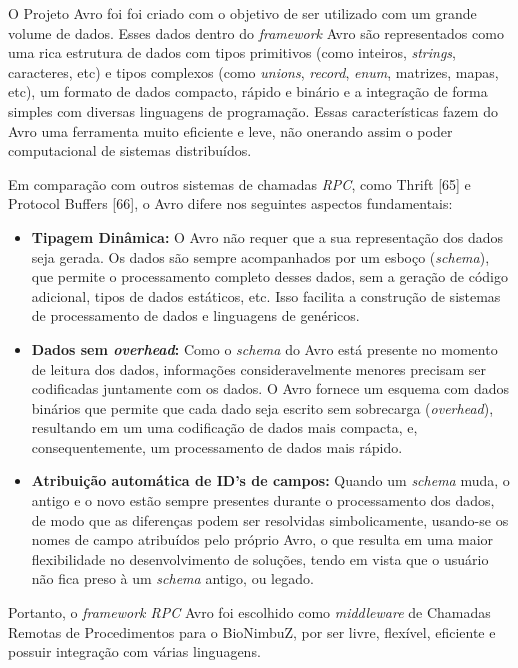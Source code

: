O Projeto Avro foi foi criado com o objetivo de ser utilizado com um grande volume de dados. Esses dados dentro do \textit{framework} Avro são representados como uma rica estrutura de dados com tipos primitivos (como inteiros, \textit{strings}, caracteres, etc) e tipos complexos (como \textit{unions}, \textit{record}, \textit{enum}, matrizes, mapas, etc), um formato de dados compacto, rápido e binário e a integração de forma simples com diversas linguagens de programação. Essas características fazem do Avro uma ferramenta muito eficiente e leve, não onerando assim o poder computacional de sistemas distribuídos.

Em comparação com outros sistemas de chamadas \textit{RPC}, como Thrift [65] e Protocol Buffers [66], o Avro difere nos seguintes aspectos fundamentais:

\begin{itemize}
	\item \textbf{Tipagem Dinâmica:} O Avro não requer que a sua representação dos dados seja gerada. Os dados são sempre acompanhados por um esboço (\textit{schema}), que permite o processamento completo desses dados, sem a geração de código adicional, tipos de dados estáticos, etc. Isso facilita a construção de sistemas de processamento de dados e linguagens de genéricos.
    
    \item \textbf{Dados sem \textit{overhead}:} Como o \textit{schema} do Avro está presente no momento de leitura dos dados, informações consideravelmente menores precisam ser codificadas juntamente com os dados. O Avro fornece um esquema com dados binários que permite que cada dado seja escrito sem sobrecarga (\textit{overhead}), resultando em um uma codificação de dados mais compacta, e, consequentemente, um processamento de dados mais rápido.
    
    \item \textbf{Atribuição automática de ID's de campos:} Quando um \textit{schema} muda, o antigo e o novo estão sempre presentes durante o processamento dos dados, de modo que as diferenças podem ser resolvidas simbolicamente, usando-se os nomes de campo atribuídos pelo próprio Avro, o que resulta em uma maior flexibilidade no desenvolvimento de soluções, tendo em vista que o usuário não fica preso à um \textit{schema} antigo, ou legado.
    
\end{itemize}

Portanto, o \textit{framework RPC} Avro foi escolhido como \textit{middleware} de Chamadas Remotas de Procedimentos para o BioNimbuZ, por ser livre, flexível, eficiente e possuir integração com várias linguagens.

